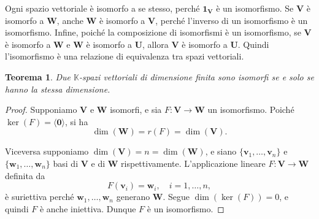 \documentclass{article}
\theoremstyle{plain}
\newtheorem{thm}{Teorema}[section]
\theoremstyle{definition}
\theoremstyle{remark}
\begin{document}
\vspace{10pt}

Ogni spazio vettoriale è isomorfo a se stesso, perché $\mathbf{1}_\mathbf{V}$ è un isomorfismo. Se $\mathbf{V}$ è isomorfo a $\mathbf{W}$, anche $\mathbf{W}$ è isomorfo a $\mathbf{V}$, perché l'inverso di un isomorfismo è un isomorfismo. 
Infine, poiché la composizione di isomorfismi è un isomorfismo, se $\mathbf{V}$ è isomorfo a $\mathbf{W}$ e $\mathbf{W}$ è isomorfo a $\mathbf{U}$, allora $\mathbf{V}$ è isomorfo a $\mathbf{U}$. 
Quindi l'isomorfismo è una relazione di equivalenza tra spazi vettoriali.

\vspace{10pt}

\begin{bxthm}
\begin{thm}
Due $\mathbb{K}$-spazi vettoriali di dimensione finita sono isomorfi se e solo se hanno la stessa dimensione.    
\end{thm}
\end{bxthm}
\begin{proof}
Supponiamo $\mathbf{V}$ e $\mathbf{W}$ isomorfi, e sia $F: \mathbf{V} \rightarrow \mathbf{W}$ un isomorfismo. 
Poiché $\ker(F) = \langle\mathbf{0}\rangle$, si ha
\[
\dim(\mathbf{W}) = r(F) = \dim(\mathbf{V}).
\]

Viceversa supponiamo $\dim(\mathbf{V}) = n = \dim(\mathbf{W})$, e siano $\{\mathbf{v}_1, \ldots, \mathbf{v}_n\}$ e $\{\mathbf{w}_1, \ldots, \mathbf{w}_n\}$ basi di $\mathbf{V}$ e di $\mathbf{W}$ rispettivamente. 
L'applicazione lineare $F: \mathbf{V} \rightarrow \mathbf{W}$ definita da
\[
F(\mathbf{v}_i) = \mathbf{w}_i, \quad i = 1, \ldots, n,
\]
è suriettiva perché $\mathbf{w}_1, \ldots, \mathbf{w}_n$ generano $\mathbf{W}$. 
Segue $\dim(\ker(F)) = 0$, e quindi $F$ è anche iniettiva. 
Dunque $F$ è un isomorfismo.    
\end{proof}

\vspace{10pt}
\end{document}
